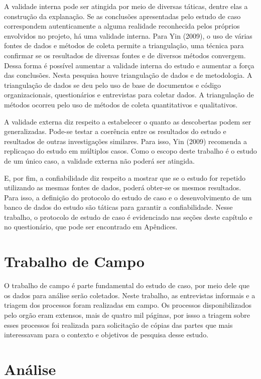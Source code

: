 A validade interna pode ser atingida por meio de diversas táticas, dentre elas a construção da explanação. Se as conclusões apresentadas pelo estudo de caso correspondem autenticamente a alguma realidade reconhecida pelos próprios envolvidos no projeto, há uma validade interna. Para Yin (2009), o uso de várias fontes de dados e métodos de coleta permite a triangulação, uma técnica para confirmar se os resultados
de diversas fontes e de diversos métodos convergem. Dessa forma é possível aumentar a
validade interna do estudo e aumentar a força das conclusões. Nesta pesquisa houve
triangulação de dados  e de metodologia. A triangulação de dados se deu
pelo uso de base de documentos e código organizacionais, questionários e entrevistas para coletar dados. A triangulação
de métodos ocorreu pelo uso de métodos de coleta quantitativos e qualitativos.

A validade externa diz respeito a estabelecer o quanto as descobertas podem ser generalizadas. Pode-se testar a coerência entre os resultados
do estudo e resultados de outras investigações similares. Para isso, Yin (2009) recomenda a replicaçao do estudo em múltiplos casos. Como o escopo deste trabalho é o estudo de um único caso, a validade externa não poderá ser atingida.

E, por fim, a confiabilidade diz respeito a mostrar que se o estudo for repetido utilizando as mesmas fontes de dados, poderá obter-se os mesmos resultados. Para isso, a definição do protocolo do estudo de caso e o 
desenvolvimento de um banco de dados do estudo são táticas para garantir a confiabilidade. Nesse trabalho, o protocolo de estudo de caso é evidenciado nas seções deste capítulo e no questionário, que pode ser encontrado em Apêndices.


\section[Trabalho de Campo]{Trabalho de Campo}

O trabalho de campo é parte fundamental do estudo de caso, por meio dele que os dados para análise serão coletados. Neste trabalho, as entrevistas informais e a triagem dos processos foram realizadas em campo. Os processos disponibilizados pelo orgão eram extensos, mais de quatro mil páginas, por issso a triagem sobre esses processos foi realizada para solicitação de cópias das partes que mais interessavam para o contexto e objetivos de pesquisa desse estudo.

\section[Análise]{Análise} 

